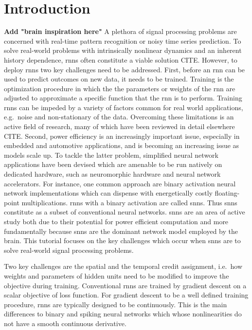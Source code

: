 \documentclass[journal,onecolumn,11pt]{IEEEtran}
\begin{document}
\section{Introduction}
\textbf{Add "brain inspiration here"}
A plethora of signal processing problems are concerned with real-time pattern recognition or noisy time series prediction.
To solve real-world problems with intrinsically nonlinear dynamics and an inherent history dependence, \glspl{rnn} often constitute a viable solution CITE.
However, to deploy \glspl{rnn} two key challenges need to be addressed.
First, before an \gls{rnn} can be used to predict outcomes on new data, it needs to be trained. 
Training is the optimization procedure in which the the parameters or weights of the \gls{rnn} are adjusted to approximate a specific function that the \gls{rnn} is to perform.
Training \glspl{rnn} can be impeded by a variety of factors common for real world applications, e.g.\ noise and non-stationary of the data. 
Overcoming these limitations is an active field of research, many of which have been reviewed in detail elsewhere CITE. %
Second, power efficiency is an increasingly important issue, especially in embedded and automotive applications, and is becoming an increasing issue as models scale up. %
To tackle the latter problem, simplified neural network applications have been devised which are amenable to be run natively on dedicated hardware, such as neuromorphic hardware and neural network accelerators. 
For instance, one common approach are binary activation neural network implementations which can dispense with energetically costly floating-point multiplications. %
\Glspl{rnn} with a binary activation are called \glspl{snn}.
Thus \glspl{snn} constitute as a subset of conventional neural networks. 
\Glspl{snn} are an area of active study both due to their potential for power efficient computation and more fundamentally because \glspl{snn} are the dominant network model employed by the brain.
This tutorial focuses on the key challenges which occur when \glspl{snn} are to solve real-world signal processing problems. 


Two key challenges are the spatial and the temporal credit assignment, i.e.\ how weights and parameters of hidden units need to be modified to improve the objective during training.
Conventional \glspl{rnn} are trained by gradient descent on a scalar objective of loss function. For gradient descent to be a well defined training procedure, \glspl{rnn} are typically designed to be continuously.
This is the main differences to binary and spiking neural networks which whose nonlinearities do not have a smooth continuous derivative. 
\end{document}
